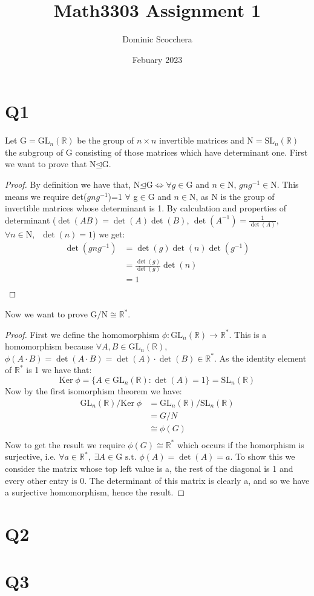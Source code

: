 \documentclass{article}
\title{Math3303 Assignment 1}
\author{Dominic Scocchera}
\date{Febuary 2023}
\begin{document}
\maketitle
\section*{Q1}
Let $\text{G} = \text{GL}_n(\mathbb{R})$ be the group of $n \times n$ invertible matrices and $\text{N} = \text{SL}_n(\mathbb{R})$ the subgroup of G consisting of those matrices which have determinant one. First we want to prove that N$\unlhd$G.
\begin{proof}
By definition we have that, N$\unlhd$G$\iff\forall g\in$G and $n\in$N, $gng^{-1}\in$N. This means we require det($gng^{-1}$)=1 $\forall$ g$\in$G and $n\in$N, as N is the group of invertible matrices whose determinant is 1. By calculation and properties of determinant ($\det(AB)=\det(A)\det(B)$, $\det(A^{-1})=\frac{1}{\det(A)}$, $\forall n\in\text{N},\;\;\det(n)=1$) we get:
\begin{align*}
    \det(gng^{-1})&=\det(g)\det(n)\det(g^{-1})\\
    &=\frac{\det(g)}{\det(g)}\det(n)\\
    &=1\\
\end{align*}
\end{proof}
\noindent Now we want to prove $\text{G}/\text{N}\cong\mathbb{R}^*$.
\begin{proof}
First we define the homomorphism $\phi:\text{GL}_n(\mathbb{R})\rightarrow\mathbb{R}^*$. This is a homomorphism because $\forall A,B\in\text{GL}_n(\mathbb{R})$, $\phi(A\cdot B)=\det(A\cdot B)=\det(A)\cdot\det(B)\in\mathbb{R}^*$. As the identity element of $\mathbb{R}^*$ is 1 we have that:
$$\text{Ker}\;\phi=\{A\in\text{GL}_n(\mathbb{R}):\det(A)=1\}=\text{SL}_n(\mathbb{R})$$
Now by the first isomorphism theorem we have:
\begin{align*}
\text{GL}_n(\mathbb{R})/\text{Ker}\;\phi&=\text{GL}_n(\mathbb{R})/\text{SL}_n(\mathbb{R})\\
&=G/N\\
&\cong\phi(G)\\
\end{align*}
Now to get the result we require $\phi(G)\cong\mathbb{R}^*$ which occurs if the homorphism is surjective, i.e. $\forall a\in\mathbb{R}^*,\;\exists A\in \text{G } \text{s.t. } \phi(A)=\det(A)=a$. To show this we consider the matrix whose top left value is a, the rest of the diagonal is 1 and every other entry is 0. The determinant of this matrix is clearly a, and so we have a surjective homomorphism, hence the result.
\end{proof}
\section*{Q2}
\section*{Q3}
\end{document}
